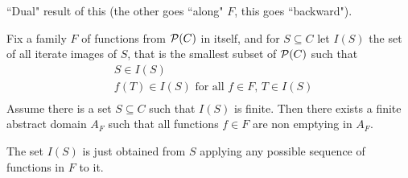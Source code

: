 ``Dual" result of this (the other goes ``along" $F$, this goes ``backward").
\begin{prop}
	Fix a family $F$ of functions from $\mathcal{P}(C)$ in itself, and for $S \subseteq C$ let $I(S)$ the set of all iterate images of $S$, that is the smallest subset of $\mathcal{P}(C)$ such that
	\begin{align*}
		&S \in I(S) \\
		&f(T) \in I(S) \text{ for all } f \in F \text{, } T \in I(S)\\
	\end{align*}
	Assume there is a set $S \subseteq C$ such that $I(S)$ is finite. Then there exists a finite abstract domain $A_F$ such that all functions $f \in F$ are non emptying in $A_F$.
\end{prop}
The set $I(S)$ is just obtained from $S$ applying any possible sequence of functions in $F$ to it.
